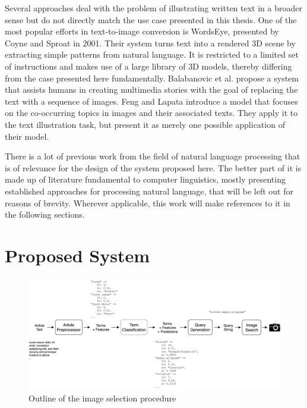\documentclass[11pt,a4paper,twoside]{article}
\begin{document}
Several approaches deal with the problem of illustrating written text in a broader sense but do not directly match the use case presented in this thesis. One of the most popular efforts in text-to-image conversion is WordsEye, presented by Coyne and Sproat in 2001. \cite{Coyne2001WordsEye:System} Their system turns text into a rendered 3D scene by extracting simple patterns from natural language. It is restricted to a limited set of instructions and makes use of a large library of 3D models, thereby differing from the case presented here fundamentally. Balabanovic et al. propose a system that assists humans in creating multimedia stories with the goal of replacing the text with a sequence of images. \cite{Balabanovic2000StorytellingPhotographs} Feng and Lapata introduce a model that focuses on the co-occurring topics in images and their associated texts. They apply it to the text illustration task, but present it as merely one possible application of their model. \cite{Feng2010TopicIllustration}

\bigskip

There is a lot of previous work from the field of natural language processing that is of relevance for the design of the system proposed here. The better part of it is made up of literature fundamental to computer linguistics, mostly presenting established approaches for processing natural language, that will be left out for reasons of brevity. Wherever applicable, this work will make references to it in the following sections.


\cleardoublepage

\section{Proposed System} \label{System}

\begin{figure}[h]
  \includegraphics[width=\columnwidth]{picpic-overview.png}
  \caption{Outline of the image selection procedure}
  \label{fig:picpic-overview}
\end{figure}
\end{document}
